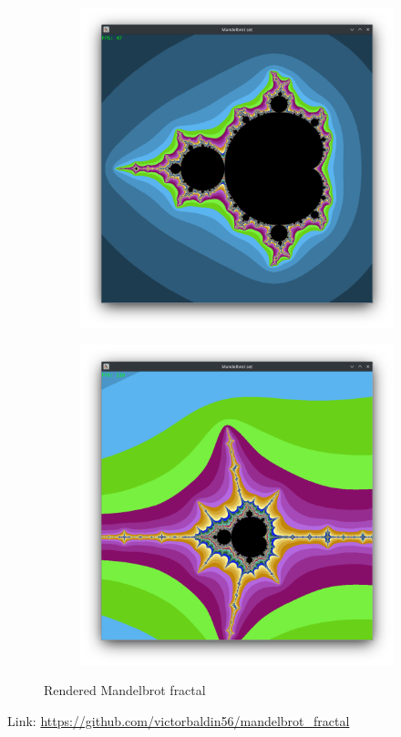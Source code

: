 \documentclass[a4paper,10pt]{memoir} %
\begin{document}
{\begin{figure}[h]
    \centering
    \begin{subfigure}[b]{0.25\textwidth}
        \includegraphics[width=\textwidth]{mandelbrot.png}
    \end{subfigure}
    \begin{subfigure}[b]{0.25\textwidth}
        \includegraphics[width=\textwidth]{zoomed.png}
    \end{subfigure}

    \caption{Rendered Mandelbrot fractal}
\end{figure}

Link: \url{https://github.com/victorbaldin56/mandelbrot_fractal}
}
\end{document}
